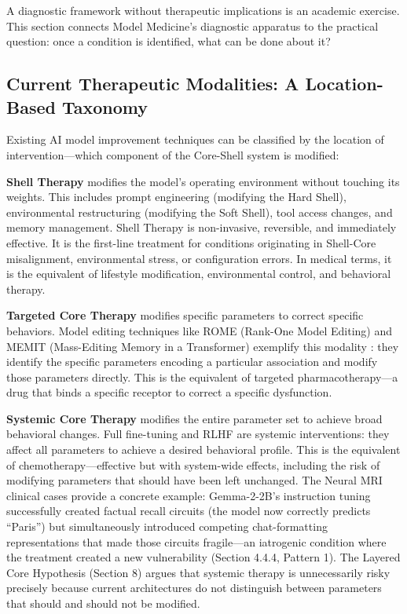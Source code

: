 \documentclass[11pt]{article}
\begin{document}
A diagnostic framework without therapeutic implications is an academic exercise. This section connects Model Medicine's diagnostic apparatus to the practical question: once a condition is identified, what can be done about it?

\subsection{Current Therapeutic Modalities: A Location-Based Taxonomy}

Existing AI model improvement techniques can be classified by the location of intervention---which component of the Core-Shell system is modified:

\textbf{Shell Therapy} modifies the model's operating environment without touching its weights. This includes prompt engineering (modifying the Hard Shell), environmental restructuring (modifying the Soft Shell), tool access changes, and memory management. Shell Therapy is non-invasive, reversible, and immediately effective. It is the first-line treatment for conditions originating in Shell-Core misalignment, environmental stress, or configuration errors. In medical terms, it is the equivalent of lifestyle modification, environmental control, and behavioral therapy.

\textbf{Targeted Core Therapy} modifies specific parameters to correct specific behaviors. Model editing techniques like ROME (Rank-One Model Editing) and MEMIT (Mass-Editing Memory in a Transformer) exemplify this modality \citep{Meng2022, Meng2023}: they identify the specific parameters encoding a particular association and modify those parameters directly. This is the equivalent of targeted pharmacotherapy---a drug that binds a specific receptor to correct a specific dysfunction.

\textbf{Systemic Core Therapy} modifies the entire parameter set to achieve broad behavioral changes. Full fine-tuning and RLHF are systemic interventions: they affect all parameters to achieve a desired behavioral profile. This is the equivalent of chemotherapy---effective but with system-wide effects, including the risk of modifying parameters that should have been left unchanged. The Neural MRI clinical cases provide a concrete example: Gemma-2-2B's instruction tuning successfully created factual recall circuits (the model now correctly predicts ``Paris'') but simultaneously introduced competing chat-formatting representations that made those circuits fragile---an iatrogenic condition where the treatment created a new vulnerability (Section 4.4.4, Pattern 1). The Layered Core Hypothesis (Section 8) argues that systemic therapy is unnecessarily risky precisely because current architectures do not distinguish between parameters that should and should not be modified.
\end{document}
